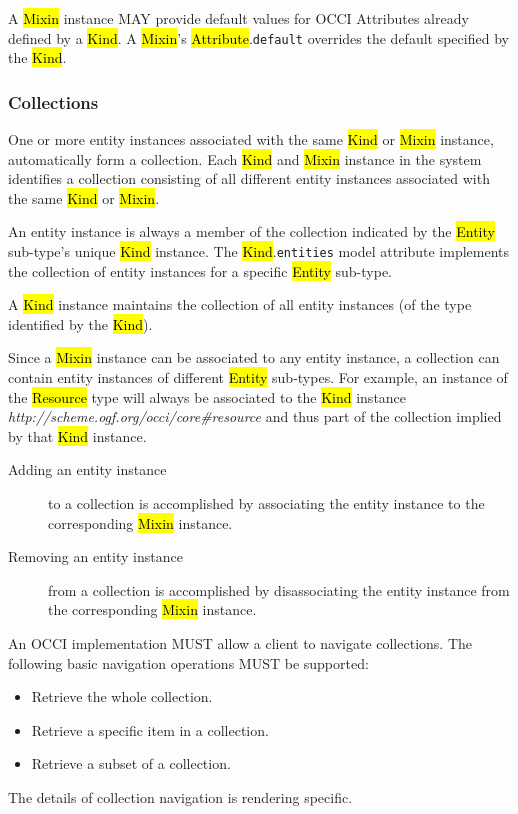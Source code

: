 \documentclass[10pt,a4paper]{article}
\begin{document}
A \hl{Mixin} instance MAY provide default values for OCCI Attributes already
defined by a \hl{Kind}. A \hl{Mixin}'s \hl{Attribute}.{\tt default} overrides
the default specified by the \hl{Kind}.

\subsubsection{Collections}
\label{sec:collection}
One or more entity instances associated with the same \hl{Kind} or
\hl{Mixin} instance, automatically form a collection.  Each \hl{Kind}
and \hl{Mixin} instance in the system identifies a collection
consisting of all different entity instances associated with the same
\hl{Kind} or \hl{Mixin}.

An entity instance is always a member of the collection indicated by
the \hl{Entity} sub-type's unique \hl{Kind} instance.
The \hl{Kind}.{\tt entities} model attribute implements the collection
of entity instances for a specific \hl{Entity} sub-type.

A \hl{Kind}
instance maintains the collection of all entity instances (of the
type identified by the \hl{Kind}).

Since a \hl{Mixin} instance can be associated to any entity
instance, a collection can contain entity instances of different
\hl{Entity} sub-types.
For example, an instance of the \hl{Resource} type will always be
associated to the \hl{Kind} instance
\textit{http://scheme.ogf.org/occi/core\#resource} and thus part of
the collection implied by that \hl{Kind} instance.
%
\begin{description}
  \item[Adding an entity instance] to a collection is accomplished by
    associating the entity instance to the corresponding \hl{Mixin}
    instance.
  \item[Removing an entity instance] from a collection is
    accomplished by disassociating the entity instance from the
    corresponding \hl{Mixin} instance.
\end{description}
%
An OCCI implementation MUST allow a client to navigate
collections. The following basic navigation operations MUST be
supported:
%
\begin{itemize}
  \item Retrieve the whole collection.
  \item Retrieve a specific item in a collection.
  \item Retrieve a subset of a collection.
\end{itemize}
%
The details of collection navigation is rendering specific.
\end{document}
